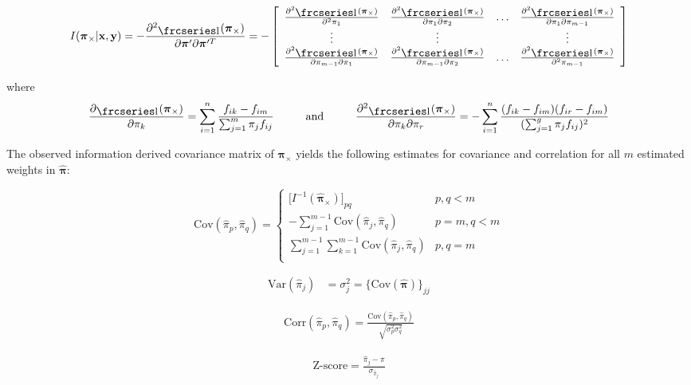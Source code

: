 \documentclass[12pt]{amsart}
\newcommand{\textfrc}[1]{{\frcseries#1}}
\newcommand{\mathfrc}[1]{\raisebox{-0.8mm}{\text{\textfrc{\small #1}}}\hspace{0.4mm}}
\newcommand{\vect}[1]{\boldsymbol{\mathbf{#1}}}
\newcommand{\eqn}[1]{\begin{align*}
#1
\end{align*}}
\newcommand{\Bl}{\Big\{}
\newcommand{\Br}{\Big\}}
\newcommand{\mtx}[4]{
\[
#1 = #2
\left[ {\begin{array}{#3}
 #4
 \end{array} } \right]
\]
}
\newcommand{\eqnset}[4]{
\[ #1 = #2 \left\{ \begin{array}{#3}
        #4
\end{array} \right. \] 
}
\newcommand{\vx}{\vect{x}}
\newcommand{\vy}{\vect{y}}
\newcommand{\vp}{\vect{\pi}}
\newcommand{\vph}{\hat{\vect{\pi}}}
\newcommand{\hessllg}[2]{\sumn \frac{f_{#1}}{(\sumg \pi_j f_j)^2 f_{#2}}}
\newcommand{\hesslld}[2]{\frac{\partial^2 \llpp}{\partial \pi_{#1} \partial \pi_{#2}}}
\newcommand{\sumn}{\sum^n_{i=1}}
\newcommand{\summ}{\sum^m_{j=1}}
\newcommand{\sumg}{\sum^g_{j=1}}
\newcommand{\vpg}{\vp_{\times}}
\newcommand{\vpgh}{\hat{\vp}_{\times}}
\newcommand{\llpp}{\mathfrc{l}(\vpg)}
\begin{document}
\mtx{I(\vpg|\vx,\vy)=-\frac{\partial^2 \llpp}{\partial \vp^\prime \partial \vp^{\prime T}}}{-}{cccc}{
	\frac{\partial^2 \llpp}{\partial^2 \pi_1} & \hesslld{1}{2} & \ldots & \hesslld{1}{m-1}	\\
	\vdots & \vdots & & \vdots	\\
	\hesslld{m-1}{1} & \hesslld{m-1}{2} & \ldots & \frac{\partial^2 \llpp}{\partial^2 \pi_{m-1}}
}



where
\eqn{
	\frac{\partial \llpp}{\partial \pi_k} = \sumn \frac{f_{ik} - f_{im}}{\summ \pi_j f_{ij}}	\hspace{10mm}\text{and}\hspace{10mm}	\frac{\partial^2 \llpp}{\partial \pi_k \partial \pi_r} = -\sumn \frac{(f_{ik}-f_{im}) (f_{ir}-f_{im})}{(\sumg \pi_j f_{ij})^2}
}




The observed information derived covariance matrix of $\vpg$ yields the following estimates for covariance and correlation for all $m$ estimated weights in $\vph$:

\eqnset{\text{Cov}(\hat{\pi}_p,\hat{\pi}_q)}{}{ll}{
	\big[I^{-1}(\vpgh) \big]_{pq}				& p,q<m	\\
	-\sum\limits_{j=1}^{m-1} \text{Cov}(\hat{\pi}_j,\hat{\pi}_q)		& p=m,q<m	\\
	\sum\limits_{j=1}^{m-1} \sum\limits_{k=1}^{m-1} \text{Cov}(\hat{\pi}_j,\hat{\pi}_q)		& p, q=m	\\
}

\eqn{
	\text{Var}(\hat{\pi}_j) &= \sigma^2_j = \Bl  \text{Cov}(\vph) \Br_{jj}
}

\eqn{
	\text{Corr}(\hat{\pi}_p,\hat{\pi}_q) = \frac{\text{Cov}(\hat{\pi}_p,\hat{\pi}_q)}{\sqrt{\sigma^2_p \sigma^2_q}}
}

\eqn{
	\text{Z-score} = \frac{\hat{\pi}_j - \pi}{\sigma_{\hat{\pi}_j}}
}
\end{document}
